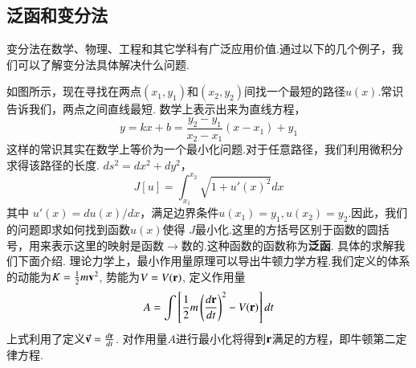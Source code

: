 \subsection{泛函和变分法}
\label{subsec:functional}
变分法在数学、物理、工程和其它学科有广泛应用价值.通过以下的几个例子，我们可以了解变分法具体解决什么问题.

如图所示，现在寻找在两点$(x_1, y_1)$和$(x_2,y_2)$间找一个最短的路径$u(x)$.常识告诉我们，两点之间直线最短.
数学上表示出来为直线方程，
\[
  y = k x + b = \frac{y_2 - y_1}{x_2 - x_1} ( x - x_1) + y_1  
\]
这样的常识其实在数学上等价为一个最小化问题.对于任意路径，我们利用微积分求得该路径的长度.
$ds^2 = dx^2 + dy^2$，
\[
J[u] = \int_{x_1}^{x_2} \sqrt{ 1 + u'(x)^2} dx    
\]
其中 $u'(x) = du(x)/dx$，满足边界条件$u(x_1) = y_1, u(x_2) = y_2$.因此，我们的问题即求如何找到函数$u(x)$使得
$J$最小化.这里的方括号区别于函数的圆括号，用来表示这里的映射是函数$\to$数的.这种函数的函数称为\textbf{泛函}.
具体的求解我们下面介绍.
理论力学上，最小作用量原理可以导出牛顿力学方程.我们定义的体系的动能为$K = {\frac{1}{2}} m {\mathbf{v}}^2$,
势能为$V = V({\mathbf{r}})$, 定义作用量
\begin{equation}
  A = \int \left[ {\frac{1}{2}} m \left( \frac{d{\mathbf{r}}}{dt} \right)^2 - V({\mathbf{r}}) \right] dt 
\end{equation}
上式利用了定义$\vec{{\mathbf{v}}} = \frac{d{\mathbf{r}}}{dt}$. 对作用量$A$进行最小化将得到${\mathbf{r}}$满足的方程，即牛顿第二定律方程.

